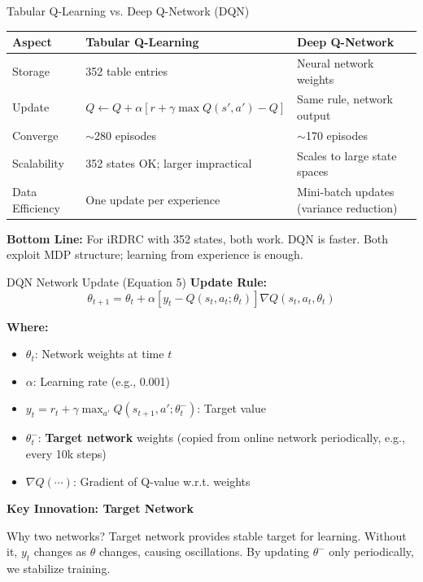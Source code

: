 \documentclass{beamer}
\begin{document}
\begin{frame}{Tabular Q-Learning vs. Deep Q-Network (DQN)}
  \scriptsize
  \begin{tabular}{|p{1.2cm}|p{3.3cm}|p{3.3cm}|}
    \hline
    \textbf{Aspect} & \textbf{Tabular Q-Learning} & \textbf{Deep Q-Network} \\
    \hline
    Storage & 352 table entries & Neural network weights \\
    \hline
    Update & $Q \gets Q + \alpha[r + \gamma \max Q(s',a') - Q]$ & Same rule, network output \\
    \hline
    Converge & $\sim$280 episodes & $\sim$170 episodes \\
    \hline
    Scalability & 352 states OK; larger impractical & Scales to large state spaces \\
    \hline
    Data Efficiency & One update per experience & Mini-batch updates (variance reduction) \\
    \hline
  \end{tabular}

  \vspace{0.1cm}
  \small\textbf{Bottom Line:} For iRDRC with 352 states, both work. DQN is faster. Both exploit MDP structure; learning from experience is enough.

  \normalsize
\end{frame}

\begin{frame}{DQN Network Update (Equation 5)}
  \textbf{Update Rule:}
  $$\theta_{t+1} = \theta_t + \alpha \left[ y_t - Q(s_t, a_t; \theta_t) \right] \nabla Q(s_t, a_t, \theta_t)$$

  \vspace{0.2cm}
  \textbf{Where:}
  \begin{itemize}
    \item $\theta_t$: Network weights at time $t$
    \item $\alpha$: Learning rate (e.g., 0.001)
    \item $y_t = r_t + \gamma \max_{a'} Q(s_{t+1}, a'; \theta^-_t)$: Target value
    \item $\theta^-_t$: \textbf{Target network} weights (copied from online network periodically, e.g., every 10k steps)
    \item $\nabla Q(\cdots)$: Gradient of Q-value w.r.t. weights
  \end{itemize}

  \vspace{0.2cm}
  \textbf{Key Innovation: Target Network}

  Why two networks? Target network provides stable target for learning. Without it, $y_t$ changes as $\theta$ changes, causing oscillations. By updating $\theta^-$ only periodically, we stabilize training.
\end{frame}
\end{document}
